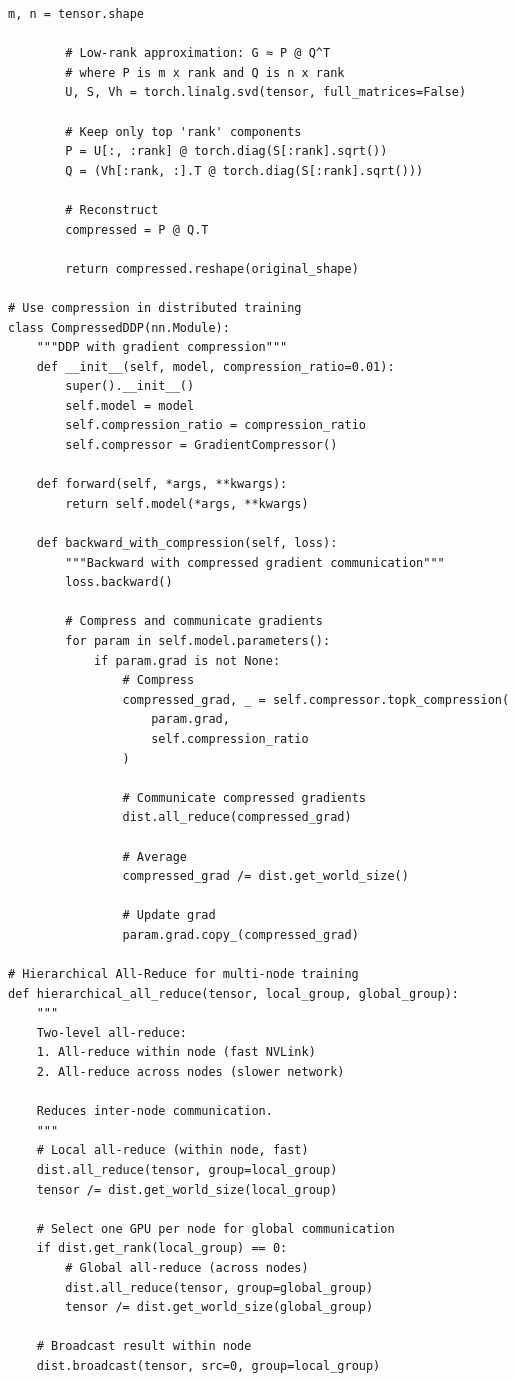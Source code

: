 \begin{lstlisting}[style=python, caption=Gradient compression techniques]
        m, n = tensor.shape

        # Low-rank approximation: G ≈ P @ Q^T
        # where P is m x rank and Q is n x rank
        U, S, Vh = torch.linalg.svd(tensor, full_matrices=False)

        # Keep only top 'rank' components
        P = U[:, :rank] @ torch.diag(S[:rank].sqrt())
        Q = (Vh[:rank, :].T @ torch.diag(S[:rank].sqrt()))

        # Reconstruct
        compressed = P @ Q.T

        return compressed.reshape(original_shape)

# Use compression in distributed training
class CompressedDDP(nn.Module):
    """DDP with gradient compression"""
    def __init__(self, model, compression_ratio=0.01):
        super().__init__()
        self.model = model
        self.compression_ratio = compression_ratio
        self.compressor = GradientCompressor()

    def forward(self, *args, **kwargs):
        return self.model(*args, **kwargs)

    def backward_with_compression(self, loss):
        """Backward with compressed gradient communication"""
        loss.backward()

        # Compress and communicate gradients
        for param in self.model.parameters():
            if param.grad is not None:
                # Compress
                compressed_grad, _ = self.compressor.topk_compression(
                    param.grad,
                    self.compression_ratio
                )

                # Communicate compressed gradients
                dist.all_reduce(compressed_grad)

                # Average
                compressed_grad /= dist.get_world_size()

                # Update grad
                param.grad.copy_(compressed_grad)

# Hierarchical All-Reduce for multi-node training
def hierarchical_all_reduce(tensor, local_group, global_group):
    """
    Two-level all-reduce:
    1. All-reduce within node (fast NVLink)
    2. All-reduce across nodes (slower network)

    Reduces inter-node communication.
    """
    # Local all-reduce (within node, fast)
    dist.all_reduce(tensor, group=local_group)
    tensor /= dist.get_world_size(local_group)

    # Select one GPU per node for global communication
    if dist.get_rank(local_group) == 0:
        # Global all-reduce (across nodes)
        dist.all_reduce(tensor, group=global_group)
        tensor /= dist.get_world_size(global_group)

    # Broadcast result within node
    dist.broadcast(tensor, src=0, group=local_group)
\end{lstlisting}

